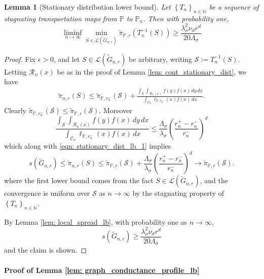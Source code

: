 \documentclass[11pt,twoside]{article}
\newtheorem{lemma}{Lemma}
\newcommand{\seq}[1]{\left\{#1\right\}_{n \in \mathbb{N}}}
\newcommand{\1}{\mathbf{1}}
\newcommand{\Pbb}{\mathbb{P}}
\newcommand{\Sset}{\mathcal{S}}
\newcommand{\Cset}{\mathcal{C}}
\newcommand{\Csig}{\Cset_{\sigma}}
\newcommand{\dx}{\,dx}
\newcommand{\dy}{\,dy}
\newcommand{\piwt}{\widetilde{\pi}}
\begin{document}
\begin{lemma}[Stationary distribution lower bound]
	\label{lem: stationary_dist_lb}
	Let $\seq{T_n}$ be a sequence of stagnating transportation maps from $\Pbb$ to $\Pbb_n$. Then with probability one,
	\begin{equation*}
	\liminf_{n \to \infty} \min_{S \in \mathcal{L}(\widetilde{G}_{n,r})} \piwt_{\Pbb,r}(T_n^{-1}(S)) \geq \frac{\lambda_{\sigma}^2 \nu_d r^d}{20\Lambda_{\sigma}}
	\end{equation*}
\end{lemma}
\begin{proof}
	Fix $\epsilon > 0$, and let $S \in \mathcal{L}(\widetilde{G}_{n,r})$ be arbitrary, writing $\Sset := T_n^{-1}(S)$. Letting $\mathcal{R}_n(x)$ be as in the proof of Lemma \ref{lem: cont_stationary_dist}, we have
	\begin{align}
	\widetilde{\pi}_{n,r}(S) \leq \piwt_{\Pbb,r_n^-}(\Sset) + \frac{\int_\Sset \int_{\mathcal{R}_n(x)}  f(y) f(x) \dy \dx}{\int_{\Csig} \ell_{\Pbb,r_n^-}(x) f(x) \dx}. \label{eqn: stationary_dist_lb_1}
	\end{align}
	Clearly $\piwt_{\Pbb,r_n^-}(\Sset) \leq \piwt_{\Pbb,r}(\Sset)$. Moreover
	\begin{equation*}
	\frac{\int_\Sset \int_{\mathcal{R}_n(x)}  f(y) f(x) \dy \dx}{\int_{\Csig} \ell_{\Pbb,r_n^-}(x) f(x) \dx} \leq \frac{\Lambda_{\sigma}}{\lambda_{\sigma}} \left(\frac{r_n^+ - r_n^-}{r_n^-}\right)^d
	\end{equation*}
	which along with \eqref{eqn: stationary_dist_lb_1} implies
	\begin{equation*}
	s(\widetilde{G}_{n,r}) \leq \widetilde{\pi}_{n,r}(S) \leq \piwt_{\Pbb,r}(\Sset) + \frac{\Lambda_{\sigma}}{\lambda_{\sigma}} \left(\frac{r_n^+ - r_n^-}{r_n^-}\right)^d \to \piwt_{\Pbb,r}(\Sset).
	\end{equation*}
	where the first lower bound comes from the fact $S \in \mathcal{L}(\widetilde{G}_{n,r})$, and the convergence is uniform over $\Sset$ as $n \to \infty$ by the stagnating property of $\seq{T_n}$. 
	
	By Lemma \ref{lem: local_spread_lb}, with probability one as $n \to \infty$,
	\begin{equation*}
	s(\widetilde{G}_{n,r}) \geq \frac{\lambda_{\sigma}^2 \nu_d r^d}{20\Lambda_{\sigma}}
	\end{equation*}
	and the claim is shown.
\end{proof}

\paragraph{Proof of Lemma \ref{lem: graph_conductance_profile_lb}}
\end{document}
